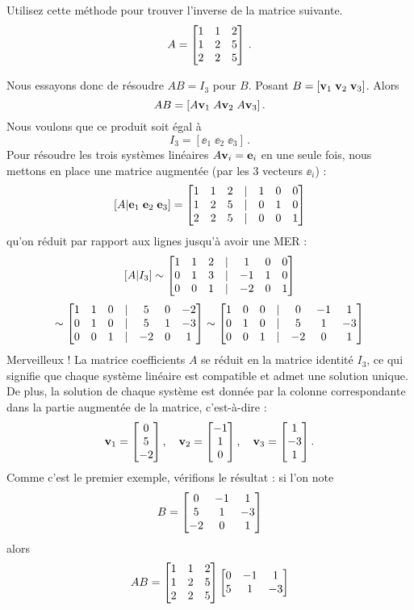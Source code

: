 \begin{myprob}  Utilisez cette m\'ethode pour trouver l'inverse de la matrice suivante.
$$
A = \left[ \begin{matrix} 1 & 1 & 2\\ 1 & 2 & 5\\ 2 & 2 & 5 \end{matrix} \right]\,.
$$

\begin{mysol}  Nous essayons donc de résoudre $AB = I_3$ pour $B$.  Posant $B = [ \mathbf{v}_1\; \mathbf{v}_2 \; \mathbf{v}_3]$.  Alors
$$
AB = [A\mathbf{v}_1 \; A\mathbf{v}_2\; A\mathbf{v}_3]\,.
$$
Nous voulons que ce produit soit égal à 
$$
I_3 = [\ee_1 \; \ee_2\; \ee_3]\,.
$$
Pour résoudre les trois systèmes linéaires $A\mathbf{v}_i = \mathbf{e}_i$ en une seule fois, nous
mettons en place une matrice augmentée (par les 3 vecteurs $\ee_i$) :
$$
[A \vert \mathbf{e}_1 \; \mathbf{e}_2\; \mathbf{e}_3] = 
\left[ \begin{matrix} 
1 & 1 & 2 &|& 1 & 0 & 0\\ 
1 & 2 & 5 &|& 0 & 1 & 0\\ 
2 & 2 & 5 &|& 0 & 0 & 1 \end{matrix} \right]
$$
qu'on r\'eduit par rapport aux lignes jusqu'à avoir une MER :
$$
[A|I_3] \sim 
\left[ \begin{matrix} 
1 & 1 & 2 &|& 1 & 0 & 0\\ 
0 & 1 & 3 &|& -1 & 1 & 0\\ 
0 & 0 & 1 &|& -2 & 0 & 1 \end{matrix} \right]
$$
$$
\sim \left[ \begin{matrix} 
1 & 1 & 0 &|& 5 & 0 & -2\\ 
0 & 1 & 0 &|& 5 & 1 & -3\\ 
0 & 0 & 1 &|& -2 & 0 & 1 \end{matrix} \right]
\sim
\left[ \begin{matrix} 
1 & 0 & 0 &|& 0 & -1 & 1\\ 
0 & 1 & 0 &|& 5 & 1 & -3\\ 
0 & 0 & 1 &|& -2 & 0 & 1 \end{matrix} \right]
$$
Merveilleux !  La matrice coefficients $A$ se réduit en la matrice identité $I_3$, ce qui 
signifie que chaque système linéaire est compatible et admet une solution unique. De plus,
la solution de chaque système est donnée par la colonne correspondante dans la partie augmentée de la matrice, c'est-à-dire :
$$
\mathbf{v}_1 = \left[ \begin{matrix} 0\\5\\-2 \end{matrix} \right], \quad \mathbf{v}_2=\left[ \begin{matrix} -1\\1\\0 \end{matrix} \right], \quad \mathbf{v}_3=\left[ \begin{matrix} 1\\-3\\1 \end{matrix} \right].
$$
Comme c'est le premier exemple, vérifions le résultat : si l'on note
$$
B = \left[ \begin{matrix} 0 & -1 & 1\\ 
 5 & 1 & -3\\ 
 -2 & 0 & 1 \end{matrix} \right]
$$
alors 
$$
AB =  \left[ \begin{matrix} 1 & 1 & 2\\ 1 & 2 & 5\\ 2 & 2 & 5 \end{matrix} \right]\left[ \begin{matrix} 0 & -1 & 1\\ 
 5 & 1 & -3\\ 
 \end{matrix} \right]$$
\end{mysol}
\end{myprob}
